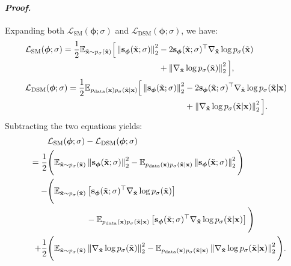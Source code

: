 \paragraph{\textit{Proof.}} Expanding both $\mathcal{L}_{\text{SM}}(\bm{\phi}; \sigma)$ and $\mathcal{L}_{\text{DSM}}(\bm{\phi}; \sigma)$, we have:
\begin{align*}
 &\mathcal{L}_{\text{SM}}(\bm{\phi}; \sigma) = \frac{1}{2} \mathbb{E}_{\tilde{{\mathbf{x}}} \sim p_\sigma(\tilde{{\mathbf{x}}})} 
 \begin{aligned}[t]
         \Big[ 
    \left\lVert{\mathbf{s}}_{\bm{\phi}}(\tilde{{\mathbf{x}}}; \sigma)\right\rVert_2^2 
    &- 2 {\mathbf{s}}_{\bm{\phi}}(\tilde{{\mathbf{x}}}; \sigma)^\top  \nabla_{\tilde{{\mathbf{x}}}} \log p_\sigma(\tilde{{\mathbf{x}}}) \\
    &+ \left\lVert\nabla_{\tilde{{\mathbf{x}}}} \log p_\sigma(\tilde{{\mathbf{x}}})\right\rVert_2^2 
    \Big], 
 \end{aligned}
\\
&\mathcal{L}_{\text{DSM}}(\bm{\phi}; \sigma) = \frac{1}{2} \mathbb{E}_{ p_{\text{data}}({\mathbf{x}})p_{\sigma}(\tilde{{\mathbf{x}}} | {\mathbf{x}})}
 \begin{aligned}[t]
         \Big[
    \left\lVert{\mathbf{s}}_{\bm{\phi}}(\tilde{{\mathbf{x}}}; \sigma)\right\rVert_2^2 
    &- 2 {\mathbf{s}}_{\bm{\phi}}(\tilde{{\mathbf{x}}}; \sigma)^\top \nabla_{\tilde{{\mathbf{x}}}} \log p_{\sigma}(\tilde{{\mathbf{x}}} | {\mathbf{x}}) \\
    &+ \left\lVert\nabla_{\tilde{{\mathbf{x}}}} \log p_{\sigma}(\tilde{{\mathbf{x}}} | {\mathbf{x}})\right\rVert_2^2 
    \Big].
 \end{aligned}
\end{align*}
Subtracting the two equations yields:
\begin{align*}
 &\mathcal{L}_{\text{SM}}(\bm{\phi}; \sigma) -\mathcal{L}_{\text{DSM}}(\bm{\phi}; \sigma) 
 \\= \frac{1}{2} &\Bigg( \mathbb{E}_{\tilde{{\mathbf{x}}} \sim p_\sigma(\tilde{{\mathbf{x}}})} \left\lVert{\mathbf{s}}_{\bm{\phi}}(\tilde{{\mathbf{x}}}; \sigma)\right\rVert_2^2 - \mathbb{E}_{ p_{\text{data}}({\mathbf{x}})p_{\sigma}(\tilde{{\mathbf{x}}} | {\mathbf{x}})} \left\lVert{\mathbf{s}}_{\bm{\phi}}(\tilde{{\mathbf{x}}}; \sigma)\right\rVert_2^2\Bigg)
 \\ \quad - &  
 \begin{aligned}[t]
 \Bigg(
      \mathbb{E}_{\tilde{{\mathbf{x}}} \sim p_\sigma(\tilde{{\mathbf{x}}})}  &\left[ {\mathbf{s}}_{\bm{\phi}}(\tilde{{\mathbf{x}}}; \sigma)^\top  \nabla_{\tilde{{\mathbf{x}}}} \log p_\sigma(\tilde{{\mathbf{x}}}) \right] \\ 
      &- \mathbb{E}_{ p_{\text{data}}({\mathbf{x}})p_{\sigma}(\tilde{{\mathbf{x}}} | {\mathbf{x}})}\left[ {\mathbf{s}}_{\bm{\phi}}(\tilde{{\mathbf{x}}}; \sigma)^\top  \nabla_{\tilde{{\mathbf{x}}}} \log p_\sigma(\tilde{{\mathbf{x}}}| {\mathbf{x}})\right]
      \Bigg)
 \end{aligned}
 \\ \quad +  \frac{1}{2}&\Bigg(\mathbb{E}_{\tilde{{\mathbf{x}}} \sim p_\sigma(\tilde{{\mathbf{x}}})}  \left\lVert\nabla_{\tilde{{\mathbf{x}}}} \log p_\sigma(\tilde{{\mathbf{x}}})\right\rVert_2^2  -  \mathbb{E}_{ p_{\text{data}}({\mathbf{x}})p_{\sigma}(\tilde{{\mathbf{x}}} | {\mathbf{x}})} \left\lVert\nabla_{\tilde{{\mathbf{x}}}} \log p_{\sigma}(\tilde{{\mathbf{x}}} | {\mathbf{x}})\right\rVert_2^2   \Bigg).
\end{align*}
